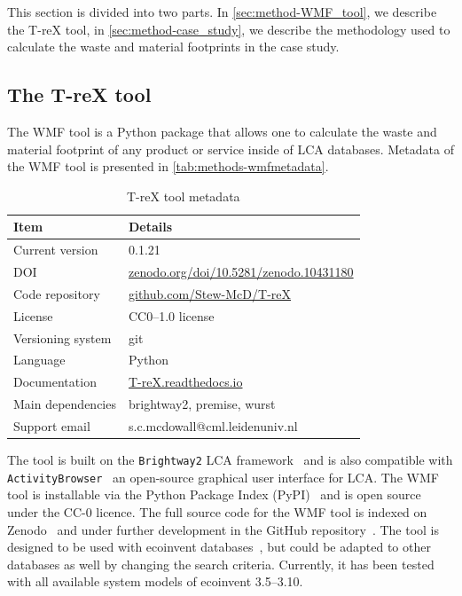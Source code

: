 This section is divided into two parts. In \autoref{sec:method-WMF_tool}, we describe the T-reX tool, in \autoref{sec:method-case_study}, we describe the methodology used to calculate the waste and material footprints in the case study.

\subsection{The T-reX tool}
\label{sec:method-WMF_tool}

The WMF tool is a Python package that allows one to calculate the waste and material footprint of any product or service inside of LCA databases. Metadata of the WMF tool is presented in \autoref{tab:methods-wmfmetadata}. 

\begin{table}[h]
    \caption{T-reX tool metadata}
    \label{tab:methods-wmfmetadata}
    \centering
    \begin{tabular}{ll}
    \toprule
    \textbf{Item} & \textbf{Details} \\
    \midrule
    Current version & 0.1.21 \\
    DOI & \url{zenodo.org/doi/10.5281/zenodo.10431180} \\
    Code repository & \url{github.com/Stew-McD/T-reX} \\
    License & CC0--1.0 license \\
    Versioning system & git \\
    Language & Python \\
    Documentation & \url{T-reX.readthedocs.io} \\
    Main dependencies & brightway2, premise, wurst \\
    Support email & s.c.mcdowall@cml.leidenuniv.nl \\
    \bottomrule
    \end{tabular}
\end{table}
    
    
The tool is built on the \texttt{Brightway2} LCA framework~\citep{mutel2017brightway} and is also compatible with \texttt{ActivityBrowser}~\citep{steubing2020activitybrowser} an open-source graphical user interface for LCA. The WMF tool is installable via the Python Package Index (PyPI)~\citep{mcdowall2023wmfpipy} and is open source under the CC-0 licence. The full source code for the WMF tool is indexed on Zenodo~\citep{mcdowall2023wmfzenodo} and under further development in the GitHub repository~\citep{mcdowall2024wmfgithub}. The tool is designed to be used with ecoinvent databases~\citep{ecoinvent2016version3}, but could be adapted to other databases as well by changing the search criteria. Currently, it has been tested with all available system models of ecoinvent 3.5--3.10.

